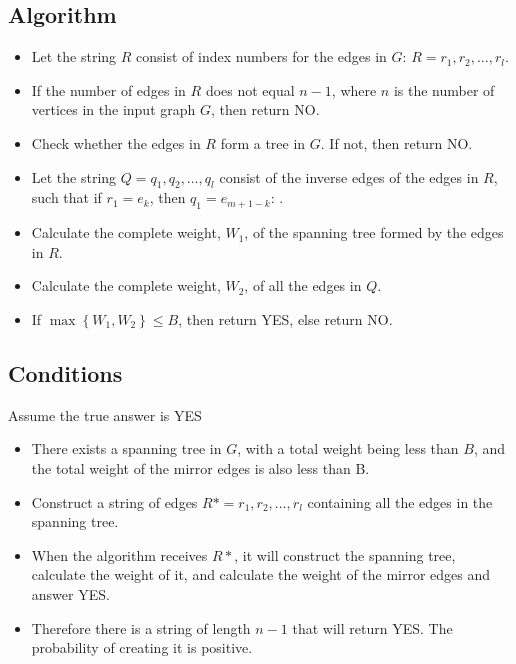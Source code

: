 \subsection{Algorithm}
\begin{itemize}
\item Let the string $R$ consist of index numbers for the edges in $G$: $R = r_1,r_2,\dots,r_l$.

\item If the number of edges in $R$ does not equal $n-1$, where $n$ is the number of vertices in the input graph $G$, then return NO.

\item Check whether the edges in $R$ form a tree in $G$. If not, then return NO.

\item Let the string $Q = q_1,q_2,\dots ,q_l$ consist of the inverse edges of the edges in $R$, such that if $r_1=e_k$, then $q_1=e_{m+1-k}$: . 

\item Calculate the complete weight, $W_1$, of the spanning tree formed by the edges in $R$.

\item Calculate the complete weight, $W_2$, of all the edges in $Q$.

\item If $\max \left\{W_1,W_2\right\}  \leq B$, then return YES, else return NO.\\

\end{itemize}

\subsection{Conditions}
Assume the true answer is YES

\begin{itemize}

\item There exists a spanning tree in $G$, with a total weight being less than $B$, and the total weight of the mirror edges is also less than B.

\item Construct a string of edges $R* = r_1,r_2, \dots ,r_l$ containing all the edges in the spanning tree.

\item When the algorithm receives $R*$, it will construct the spanning tree, calculate the weight of it, and calculate the weight of the mirror edges and answer YES.

\item Therefore there is a string of length $n-1$ that will return YES. The probability of creating it is positive.

\end{itemize}

